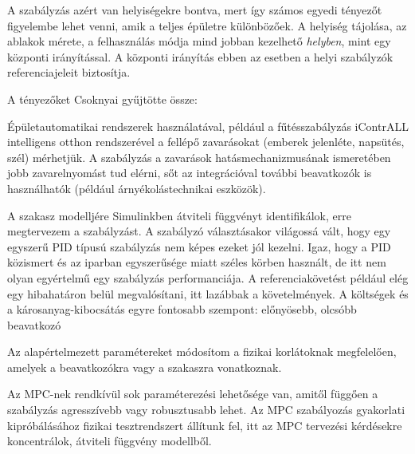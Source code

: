 A szabályzás azért van helyiségekre bontva, mert így számos egyedi tényezőt figyelembe lehet venni, amik a teljes épületre különbözőek. A helyiség tájolása, az ablakok mérete, a felhasználás módja mind jobban kezelhető \textit{helyben}, mint egy központi irányítással. A központi irányítás ebben az esetben a helyi szabályzók referenciajeleit biztosítja.

A tényezőket Csoknyai \cite{Herz} gyűjtötte össze:





Épületautomatikai rendszerek használatával, például a fűtésszabályzás iContrALL intelligens otthon rendszerével a fellépő zavarásokat (emberek jelenléte, napsütés, szél) mérhetjük. A szabályzás a zavarások hatásmechanizmusának ismeretében jobb zavarelnyomást tud elérni, sőt az integrációval további beavatkozók is használhatók (például árnyékolástechnikai eszközök).




A szakasz modelljére Simulinkben átviteli függvényt identifikálok, erre megtervezem a szabályzást. A szabályzó választásakor világossá vált, hogy egy egyszerű PID típusú szabályzás nem képes ezeket jól kezelni. Igaz, hogy a PID közismert és az iparban egyszerűsége miatt széles körben használt, de itt nem olyan egyértelmű egy szabályzás performanciája. A referenciakövetést például elég egy hibahatáron belül megvalósítani, itt lazábbak a követelmények.
A költségek és a károsanyag-kibocsátás egyre fontosabb szempont: előnyösebb, olcsóbb beavatkozó 




Az alapértelmezett paramétereket módosítom a fizikai korlátoknak megfelelően,  amelyek a beavatkozókra vagy a szakaszra vonatkoznak.

Az MPC-nek rendkívül sok paraméterezési lehetősége van, amitől függően a szabályzás agresszívebb vagy robusztusabb lehet.   %
Az MPC szabályozás gyakorlati kipróbálásához fizikai tesztrendszert állítunk fel, itt az MPC tervezési kérdésekre koncentrálok, átviteli függvény modellből.






